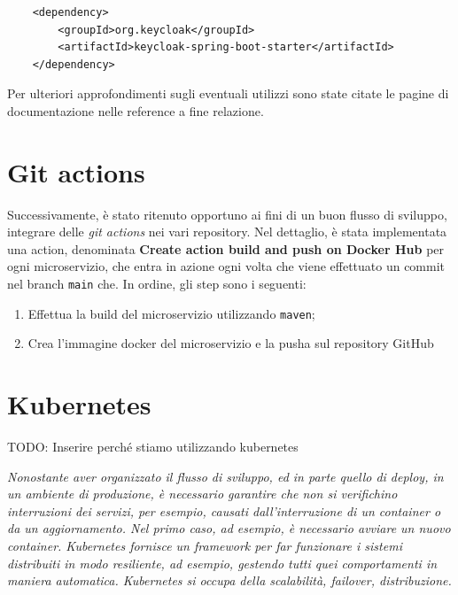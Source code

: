 \documentclass{article}
\begin{document}

\begin{verbatim}
    <dependency>
        <groupId>org.keycloak</groupId>
        <artifactId>keycloak-spring-boot-starter</artifactId>
    </dependency>
\end{verbatim}

Per ulteriori approfondimenti sugli eventuali utilizzi sono state citate le pagine di documentazione nelle reference a fine relazione.

\pagebreak

\section{Git actions}

Successivamente, è stato ritenuto opportuno ai fini di un buon flusso di sviluppo, integrare delle \textit{git actions} nei vari repository.
Nel dettaglio, è stata implementata una action, denominata \textbf{Create action build and push on Docker Hub} per ogni microservizio, che entra in azione ogni volta che viene effettuato un commit nel 
branch \texttt{main} che. In ordine, gli step sono i seguenti:

\begin{enumerate}
    \item Effettua la build del microservizio utilizzando \texttt{maven};
    \item Crea l'immagine docker del microservizio e la pusha sul repository GitHub
\end{enumerate}

\section{Kubernetes}

TODO: Inserire perché stiamo utilizzando kubernetes


\textit{
Nonostante aver organizzato il flusso di sviluppo, ed in parte quello di deploy, in un ambiente di produzione, è necessario garantire che non si verifichino interruzioni
dei servizi, per esempio, causati dall'interruzione di un container o da un aggiornamento. Nel primo caso, ad esempio, è necessario avviare un nuovo
container. Kubernetes fornisce un framework per far funzionare i sistemi distribuiti in modo resiliente, ad esempio, gestendo
tutti quei comportamenti in maniera automatica. Kubernetes si occupa della scalabilità, failover, distribuzione. 
}
\end{document}
